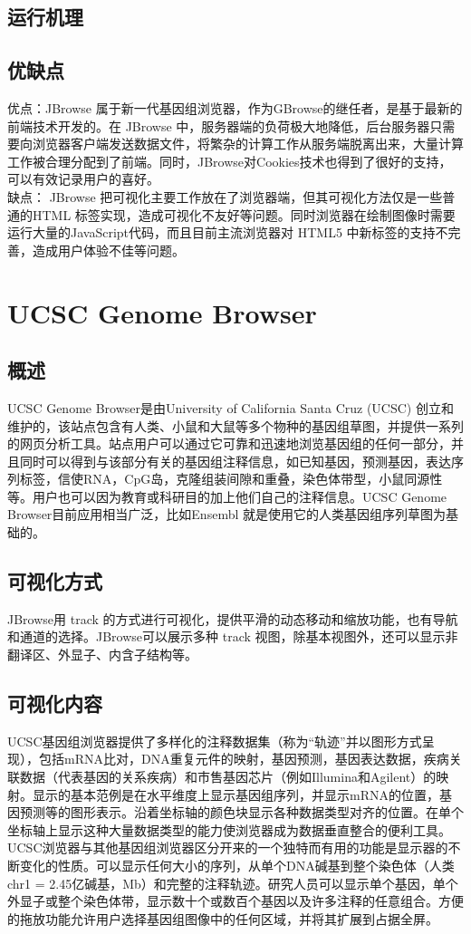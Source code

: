 		\subsection{运行机理}
		\subsection{优缺点}
		优点：JBrowse 属于新一代基因组浏览器，作为GBrowse的继任者，是基于最新的前端技术开发的。在 JBrowse 中，服务器端的负荷极大地降低，后台服务器只需要向浏览器客户端发送数据文件，将繁杂的计算工作从服务端脱离出来，大量计算工作被合理分配到了前端。同时，JBrowse对Cookies技术也得到了很好的支持，可以有效记录用户的喜好。\\
		\indent 缺点： JBrowse 把可视化主要工作放在了浏览器端，但其可视化方法仅是一些普通的HTML 标签实现，造成可视化不友好等问题。同时浏览器在绘制图像时需要运行大量的JavaScript代码，而且目前主流浏览器对 HTML5 中新标签的支持不完善，造成用户体验不佳等问题。
		\section{UCSC Genome Browser}
		\subsection{概述}
		UCSC Genome Browser是由University of California Santa Cruz (UCSC) 创立和维护的，该站点包含有人类、小鼠和大鼠等多个物种的基因组草图，并提供一系列的网页分析工具。站点用户可以通过它可靠和迅速地浏览基因组的任何一部分，并且同时可以得到与该部分有关的基因组注释信息，如已知基因，预测基因，表达序列标签，信使RNA，CpG岛，克隆组装间隙和重叠，染色体带型，小鼠同源性等。用户也可以因为教育或科研目的加上他们自己的注释信息。UCSC Genome Browser目前应用相当广泛，比如Ensembl 就是使用它的人类基因组序列草图为基础的。
		\subsection{可视化方式}
		JBrowse用 track 的方式进行可视化，提供平滑的动态移动和缩放功能，也有导航和通道的选择。JBrowse可以展示多种 track 视图，除基本视图外，还可以显示非翻译区、外显子、内含子结构等。
		
		\subsection{可视化内容}
		UCSC基因组浏览器提供了多样化的注释数据集（称为“轨迹”并以图形方式呈现），包括mRNA比对，DNA重复元件的映射，基因预测，基因表达数据，疾病关联数据（代表基因的关系疾病）和市售基因芯片（例如Illumina和Agilent）的映射。显示的基本范例是在水平维度上显示基因组序列，并显示mRNA的位置，基因预测等的图形表示。沿着坐标轴的颜色块显示各种数据类型对齐的位置。在单个坐标轴上显示这种大量数据类型的能力使浏览器成为数据垂直整合的便利工具。
		UCSC浏览器与其他基因组浏览器区分开来的一个独特而有用的功能是显示器的不断变化的性质。可以显示任何大小的序列，从单个DNA碱基到整个染色体（人类chr1 = 2.45亿碱基，Mb）和完整的注释轨迹。研究人员可以显示单个基因，单个外显子或整个染色体带，显示数十个或数百个基因以及许多注释的任意组合。方便的拖放功能允许用户选择基因组图像中的任何区域，并将其扩展到占据全屏。
		
